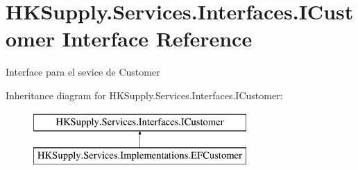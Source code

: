 \hypertarget{interface_h_k_supply_1_1_services_1_1_interfaces_1_1_i_customer}{}\section{H\+K\+Supply.\+Services.\+Interfaces.\+I\+Customer Interface Reference}
\label{interface_h_k_supply_1_1_services_1_1_interfaces_1_1_i_customer}


Interface para el sevice de Customer  


Inheritance diagram for H\+K\+Supply.\+Services.\+Interfaces.\+I\+Customer\+:\begin{figure}[H]
\begin{center}
\leavevmode
\includegraphics[height=2.000000cm]{interface_h_k_supply_1_1_services_1_1_interfaces_1_1_i_customer}
\end{center}
\end{figure}
